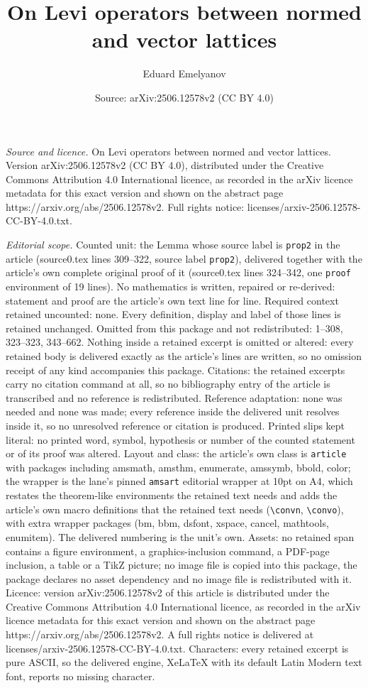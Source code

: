 \documentclass[10pt,a4paper]{amsart}
\title[On Levi operators between normed and vector lattices]{On Levi operators between normed and vector lattices}
\author{Eduard Emelyanov}
\date{Source: arXiv:2506.12578v2 (CC BY 4.0)}
\begin{document}
\maketitle

\noindent\emph{Source and licence.} On Levi operators between normed and vector lattices. Version arXiv:2506.12578v2 (CC BY 4.0), distributed under the Creative Commons Attribution 4.0 International licence, as recorded in the arXiv licence metadata for this exact version and shown on the abstract page https://arxiv.org/abs/2506.12578v2. Full rights notice: licenses/arxiv-2506.12578-CC-BY-4.0.txt.\par\smallskip

\noindent\textit{Editorial scope.} Counted unit: the Lemma whose source label is \texttt{prop2} in the article (source0.tex lines 309--322, source label \texttt{prop2}), delivered together with the article's own complete original proof of it (source0.tex lines 324--342, one \texttt{proof} environment of 19 lines). No mathematics is written, repaired or re-derived: statement and proof are the article's own text line for line. Required context retained uncounted: none. Every definition, display and label of those lines is retained unchanged. Omitted from this package and not redistributed: 1--308, 323--323, 343--662. Nothing inside a retained excerpt is omitted or altered: every retained body is delivered exactly as the article's lines are written, so no omission receipt of any kind accompanies this package. Citations: the retained excerpts carry no citation command at all, so no bibliography entry of the article is transcribed and no reference is redistributed. Reference adaptation: none was needed and none was made; every reference inside the delivered unit resolves inside it, so no unresolved reference or citation is produced. Printed slips kept literal: no printed word, symbol, hypothesis or number of the counted statement or of its proof was altered. Layout and class: the article's own class is \texttt{article} with packages including amsmath, amsthm, enumerate, amssymb, bbold, color; the wrapper is the lane's pinned \texttt{amsart} editorial wrapper at 10pt on A4, which restates the theorem-like environments the retained text needs and adds the article's own macro definitions that the retained text needs (\texttt{\textbackslash convn}, \texttt{\textbackslash convo}), with extra wrapper packages (bm, bbm, dsfont, xspace, cancel, mathtools, enumitem). The delivered numbering is the unit's own. Assets: no retained span contains a figure environment, a graphics-inclusion command, a PDF-page inclusion, a table or a TikZ picture; no image file is copied into this package, the package declares no asset dependency and no image file is redistributed with it. Licence: version arXiv:2506.12578v2 of this article is distributed under the Creative Commons Attribution 4.0 International licence, as recorded in the arXiv licence metadata for this exact version and shown on the abstract page https://arxiv.org/abs/2506.12578v2. A full rights notice is delivered at licenses/arxiv-2506.12578-CC-BY-4.0.txt. Characters: every retained excerpt is pure ASCII, so the delivered engine, XeLaTeX with its default Latin Modern text font, reports no missing character.
\end{document}
